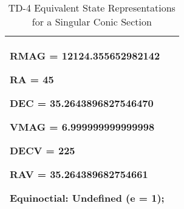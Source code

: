 \begin{table}[htbp!]
\begin{tabular}{|p{1.0 in} |p{5.0 in} |}
\begin{compactenum}
\begin{compactenum}
                  \item RMAG = 12124.355652982142
                  \item RA = 45
                  \item DEC = 35.2643896827546470
                  \item VMAG = 6.999999999999998
                  \item DECV = 225
                  \item RAV = 35.264389682754661 
              \end{compactenum}
              \item Equinoctial: Undefined (e = 1);
          \end{compactenum}\\

         \hline
\end{tabular}
   \label{Table:TD-4}
   \caption{TD-4 Equivalent State Representations for a Singular Conic Section}
\end{table} 